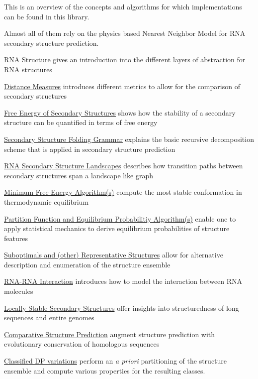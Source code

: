 This is an overview of the concepts and algorithms for which implementations can be found in this library.

Almost all of them rely on the physics based Nearest Neighbor Model for R\+NA secondary structure prediction.


\begin{DoxyItemize}
\item \hyperlink{secondary_structures}{R\+NA Structure} gives an introduction into the different layers of abstraction for R\+NA structures
\item \hyperlink{distance_measures}{Distance Measures} introduces different metrics to allow for the comparison of secondary structures
\item \hyperlink{energy_evaluation}{Free Energy of Secondary Structures} shows how the stability of a secondary structure can be quantified in terms of free energy
\item \hyperlink{folding_grammar}{Secondary Structure Folding Grammar} explains the basic recursive decomposition scheme that is applied in secondary structure prediction
\item \hyperlink{secondary_structure_landscape}{R\+NA Secondary Structure Landscapes} describes how transition paths between secondary structures span a landscape like graph
\item \hyperlink{mfe_algorithm}{Minimum Free Energy Algorithm(s)} compute the most stable conformation in thermodynamic equilibrium
\item \hyperlink{pf_algorithm}{Partition Function and Equilibrium Probabilitiy Algorithm(s)} enable one to apply statistical mechanics to derive equilibrium probabilities of structure features
\item \hyperlink{suboptimal_structures}{Suboptimals and (other) Representative Structures} allow for alternative description and enumeration of the structure ensemble
\item \hyperlink{rip}{R\+N\+A-\/\+R\+NA Interaction} introduces how to model the interaction between R\+NA molecules
\item \hyperlink{local_vs_global}{Locally Stable Secondary Structures} offer insights into structuredness of long sequences and entire genomes
\item \hyperlink{consensus_structures}{Comparative Structure Prediction} augment structure prediction with evolutionary conservation of homologous sequences
\item \hyperlink{classified_dp}{Classified DP variations} perform an {\itshape a priori} partitioning of the structure ensemble and compute various properties for the resulting classes.

\end{DoxyItemize}
